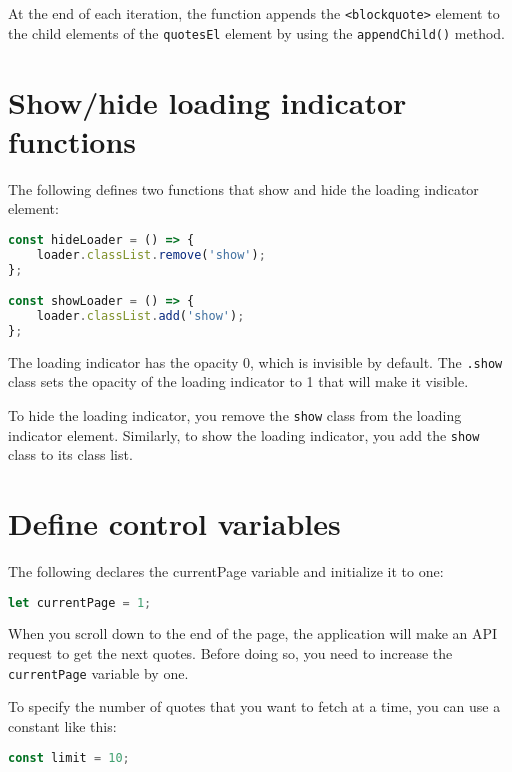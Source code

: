 \documentclass[11pt]{article}
\begin{document}
\noindent
At the end of each iteration, the function appends the \verb|<blockquote>|
element to the child elements of the \verb|quotesEl| element by
using the \verb|appendChild()| method.

\section*{Show/hide loading indicator functions}

The following defines two functions that show and hide the loading indicator element:

\begin{lstlisting}[language=JavaScript]
const hideLoader = () => {
    loader.classList.remove('show');
};

const showLoader = () => {
    loader.classList.add('show');
};
\end{lstlisting}

\noindent
The loading indicator has the opacity 0, which is invisible by default.
The \verb|.show| class sets the opacity of the loading indicator to 1
that will make it visible.
\newline

\noindent
To hide the loading indicator, you remove the \verb|show| class from the
loading indicator element. Similarly, to show the loading indicator,
you add the \verb|show| class to its class list.

\section*{Define control variables}

The following declares the currentPage variable and initialize it to one:

\begin{lstlisting}[language=JavaScript]
let currentPage = 1;
\end{lstlisting}

\noindent
When you scroll down to the end of the page, the application will make
an API request to get the next quotes. Before doing so, you need to
increase the \verb|currentPage| variable by one.
\newline

\noindent
To specify the number of quotes that you want to fetch at a time,
you can use a constant like this:

\begin{lstlisting}[language=JavaScript]
const limit = 10;
\end{lstlisting}
\end{document}
